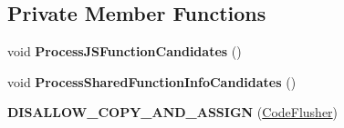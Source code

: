 \subsection*{Private Member Functions}
\begin{DoxyCompactItemize}
\item 
void {\bfseries Process\+J\+S\+Function\+Candidates} ()\hypertarget{classv8_1_1internal_1_1_code_flusher_adc96964e9002a010c26d4eee2556888d}{}\label{classv8_1_1internal_1_1_code_flusher_adc96964e9002a010c26d4eee2556888d}

\item 
void {\bfseries Process\+Shared\+Function\+Info\+Candidates} ()\hypertarget{classv8_1_1internal_1_1_code_flusher_a1d32343685a4159d0ba3413742273dc8}{}\label{classv8_1_1internal_1_1_code_flusher_a1d32343685a4159d0ba3413742273dc8}

\item 
{\bfseries D\+I\+S\+A\+L\+L\+O\+W\+\_\+\+C\+O\+P\+Y\+\_\+\+A\+N\+D\+\_\+\+A\+S\+S\+I\+GN} (\hyperlink{classv8_1_1internal_1_1_code_flusher}{Code\+Flusher})\hypertarget{classv8_1_1internal_1_1_code_flusher_aa06980f6de4595c5bd4a6fbc0cd0a7ec}{}\label{classv8_1_1internal_1_1_code_flusher_aa06980f6de4595c5bd4a6fbc0cd0a7ec}

\end{DoxyCompactItemize}
